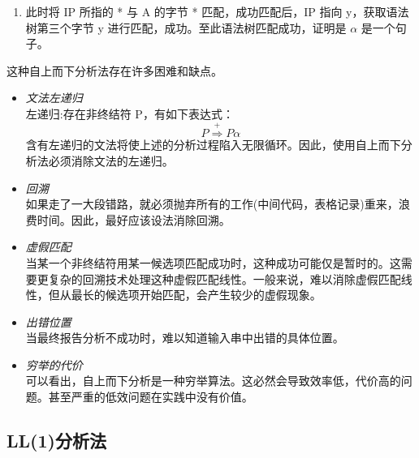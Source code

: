\begin{enumerate}
    \item 此时将 IP 所指的 * 与 A 的字节 * 匹配，成功匹配后，IP 指向 y，获取语法树第三个字节 y 进行匹配，成功。至此语法树匹配成功，证明是 $\alpha$ 是一个句子。
    
    \begin{figure}[H]
        \centering
    \end{figure}
\end{enumerate}

这种自上而下分析法存在许多困难和缺点。
\begin{itemize}
    \item \textit{文法左递归} \\
    左递归:存在非终结符 P，有如下表达式：
    \[P \stackrel{+}{\Rightarrow} P \alpha \]
    含有左递归的文法将使上述的分析过程陷入无限循环。因此，使用自上而下分析法必须消除文法的左递归。
    \item \textit{回溯} \\
    如果走了一大段错路，就必须抛弃所有的工作(中间代码，表格记录)重来，浪费时间。因此，最好应该设法消除回溯。
    \item \textit{虚假匹配} \\
    当某一个非终结符用某一候选项匹配成功时，这种成功可能仅是暂时的。这需要更复杂的回溯技术处理这种虚假匹配线性。一般来说，难以消除虚假匹配线性，但从最长的候选项开始匹配，会产生较少的虚假现象。
    \item \textit{出错位置} \\
    当最终报告分析不成功时，难以知道输入串中出错的具体位置。
    \item \textit{穷举的代价} \\
    可以看出，自上而下分析是一种穷举算法。这必然会导致效率低，代价高的问题。甚至严重的低效问题在实践中没有价值。
\end{itemize}

\subsection{LL(1)分析法}

